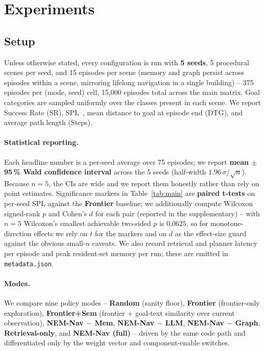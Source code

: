 \documentclass[conference,a4paper,10pt]{IEEEtran}
\begin{document}
\section{Experiments}
\label{sec:results}

\subsection{Setup}
Unless otherwise stated, every configuration is run with \textbf{5 seeds},
5 procedural scenes per seed, and 15 episodes per scene (memory and graph
persist across episodes within a scene, mirroring lifelong navigation in
a single building) -- 375 episodes per (mode, seed) cell, 15{,}000
episodes total across the main matrix. Goal categories are sampled
uniformly over the classes present in each scene. We report Success Rate
(SR), SPL~\cite{anderson2018evaluation}, mean distance to goal at
episode end (DTG), and average path length (Steps).

\paragraph{Statistical reporting.}
Each headline number is a per-seed average over 75 episodes; we report
\textbf{mean $\pm$ 95\,\% Wald confidence interval} across the 5 seeds
(half-width $1.96\,\sigma/\sqrt{n}$). Because $n=5$, the CIs are wide and
we report them honestly rather than rely on point estimates. Significance
markers in Table~\ref{tab:main} are \textbf{paired t-tests} on per-seed
SPL against the \textbf{Frontier} baseline; we additionally compute
Wilcoxon signed-rank $p$ and Cohen's $d$ for each pair (reported in the
supplementary) -- with $n{=}5$ Wilcoxon's smallest achievable two-sided
$p$ is $0.0625$, so for monotone-direction effects we rely on $t$ for the
markers and on $d$ as the effect-size guard against the obvious
small-$n$ caveats. We also record retrieval and planner latency per
episode and peak resident-set memory per run; these are emitted in
\texttt{metadata.json}.

\paragraph{Modes.}
We compare nine policy modes -- \textbf{Random} (sanity floor),
\textbf{Frontier} (frontier-only exploration), \textbf{Frontier+Sem}
(frontier + goal-text similarity over current observation),
\textbf{NEM-Nav $-$ Mem}, \textbf{NEM-Nav $-$ LLM}, \textbf{NEM-Nav $-$
Graph}, \textbf{Retrieval-only}, and \textbf{NEM-Nav (full)} -- driven
by the same code path and differentiated only by the weight vector and
component-enable switches.
\end{document}
